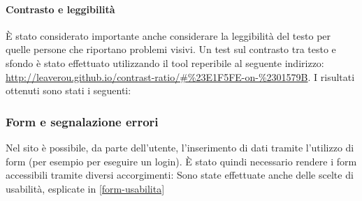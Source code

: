 \paragraph*{Contrasto e leggibilit\`a}
\`E stato considerato importante anche considerare la leggibilit\`a del testo per quelle persone che riportano problemi visivi. Un test sul contrasto tra testo e sfondo \`e stato effettuato utilizzando il tool reperibile al seguente indirizzo: \url{http://leaverou.github.io/contrast-ratio/#\%23E1F5FE-on-\%2301579B}.
I risultati ottenuti sono stati i seguenti: %

\subsubsection{Form e segnalazione errori}
\label{form-accessibilita}
Nel sito è possibile, da parte dell'utente, l'inserimento di dati tramite l'utilizzo di form (per esempio per eseguire un login). È stato quindi necessario rendere i form accessibili tramite diversi accorgimenti: %
Sono state effettuate anche delle scelte di usabilità, esplicate in \ref{form-usabilita}
